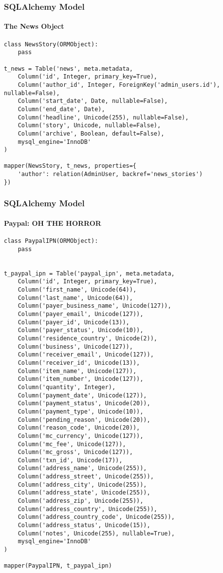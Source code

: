 \documentclass{beamer}
\begin{document}
\begin{frame}[fragile]
\frametitle{SQLAlchemy Model}
\framesubtitle{The News Object}
\begin{lstlisting}
class NewsStory(ORMObject):
    pass

t_news = Table('news', meta.metadata,
    Column('id', Integer, primary_key=True),
    Column('author_id', Integer, ForeignKey('admin_users.id'), nullable=False),
    Column('start_date', Date, nullable=False),
    Column('end_date', Date),
    Column('headline', Unicode(255), nullable=False),
    Column('story', Unicode, nullable=False),
    Column('archive', Boolean, default=False),
    mysql_engine='InnoDB'
)

mapper(NewsStory, t_news, properties={
    'author': relation(AdminUser, backref='news_stories')
})
\end{lstlisting}
\end{frame}
\begin{frame}[fragile]
\frametitle{SQLAlchemy Model}
\framesubtitle{Paypal: OH THE HORROR}
\begin{lstlisting}
class PaypalIPN(ORMObject):
    pass


t_paypal_ipn = Table('paypal_ipn', meta.metadata,
    Column('id', Integer, primary_key=True),
    Column('first_name', Unicode(64)),
    Column('last_name', Unicode(64)),
    Column('payer_business_name', Unicode(127)),
    Column('payer_email', Unicode(127)),
    Column('payer_id', Unicode(13)),
    Column('payer_status', Unicode(10)),
    Column('residence_country', Unicode(2)),
    Column('business', Unicode(127)),
    Column('receiver_email', Unicode(127)),
    Column('receiver_id', Unicode(13)),
    Column('item_name', Unicode(127)),
    Column('item_number', Unicode(127)),
    Column('quantity', Integer),
    Column('payment_date', Unicode(127)),
    Column('payment_status', Unicode(20)),
    Column('payment_type', Unicode(10)),
    Column('pending_reason', Unicode(20)),
    Column('reason_code', Unicode(20)),
    Column('mc_currency', Unicode(127)),
    Column('mc_fee', Unicode(127)),
    Column('mc_gross', Unicode(127)),
    Column('txn_id', Unicode(17)),
    Column('address_name', Unicode(255)),
    Column('address_street', Unicode(255)),
    Column('address_city', Unicode(255)),
    Column('address_state', Unicode(255)),
    Column('address_zip', Unicode(255)),
    Column('address_country', Unicode(255)),
    Column('address_country_code', Unicode(255)),
    Column('address_status', Unicode(15)),
    Column('notes', Unicode(255), nullable=True),
    mysql_engine='InnoDB'
)

mapper(PaypalIPN, t_paypal_ipn)

\end{lstlisting}
\end{frame}
\end{document}
